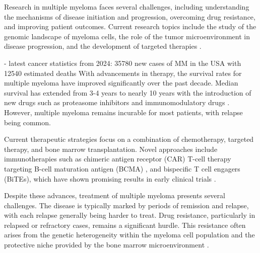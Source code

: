 Research in multiple myeloma faces several challenges, including understanding
the mechanisms of disease initiation and progression, overcoming drug
resistance, and improving patient outcomes. Current research topics include the
study of the genomic landscape of myeloma cells, the role of the tumor
microenvironment in disease progression, and the development of targeted
therapies \cite{garcia-ortizRoleTumorMicroenvironment2021}.

- latest cancer statistics from 2024: 35780 new cases of MM in the USA with 12540
estimated deaths \cite{siegelCancerStatistics20242024}
With advancements in therapy, the survival rates for multiple myeloma have
improved significantly over the past decade. Median survival has extended from
3-4 years to nearly 10 years with the introduction of new drugs such as
proteasome inhibitors and immunomodulatory drugs
\cite{palumboAdvancesTreatmentMultiple2015}. However, multiple myeloma remains
incurable for most patients, with relapse being common.

Current therapeutic strategies focus on a combination of chemotherapy, targeted
therapy, and bone marrow transplantation. Novel approaches include
immunotherapies such as chimeric antigen receptor (CAR) T-cell therapy targeting
B-cell maturation antigen (BCMA)
\cite{seckingerCD38ImmunotherapeuticTarget2018}, and bispecific T cell engagers
(BiTEs), which have shown promising results in early clinical trials
\cite{seckingerTargetExpressionGeneration2017b}.

Despite these advances, treatment of multiple myeloma presents several
challenges. The disease is typically marked by periods of remission and relapse,
with each relapse generally being harder to treat. Drug resistance, particularly
in relapsed or refractory cases, remains a significant hurdle. This resistance
often arises from the genetic heterogeneity within the myeloma cell population
and the protective niche provided by the bone marrow microenvironment
\cite{solimandoDrugResistanceMultiple2022}.

